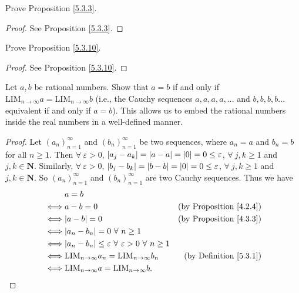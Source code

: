 \exercisesection

\begin{exercise}\label{ex 5.3.1}
    Prove Proposition \ref{5.3.3}.
\end{exercise}

\begin{proof}
    See Proposition \ref{5.3.3}.
\end{proof}

\begin{exercise}\label{ex 5.3.2}
    Prove Proposition \ref{5.3.10}.
\end{exercise}

\begin{proof}
    See Proposition \ref{5.3.10}.
\end{proof}

\begin{exercise}\label{ex 5.3.3}
    Let \(a, b\) be rational numbers.
    Show that \(a = b\) if and only if \(\text{LIM}_{n \to \infty} a = \text{LIM}_{n \to \infty} b\) (i.e., the Cauchy sequences \(a, a, a, a, \dots\) and \(b, b, b, b \dots\) equivalent if and only if \(a = b\)).
    This allows us to embed the rational numbers inside the real numbers in a well-defined manner.
\end{exercise}

\begin{proof}
    Let \((a_n)_{n = 1}^{\infty}\) and \((b_n)_{n = 1}^{\infty}\) be two sequences, where \(a_n = a\) and \(b_n = b\) for all \(n \geq 1\).
    Then \(\forall\ \varepsilon > 0\), \(\abs*{a_j - a_k} = \abs*{a - a} = \abs*{0} = 0 \leq \varepsilon\), \(\forall\ j, k \geq 1\) and \(j, k \in \mathbf{N}\).
    Similarly, \(\forall\ \varepsilon > 0\), \(\abs*{b_j - b_k} = \abs*{b - b} = \abs*{0} = 0 \leq \varepsilon\), \(\forall\ j, k \geq 1\) and \(j, k \in \mathbf{N}\).
    So \((a_n)_{n = 1}^{\infty}\) and \((b_n)_{n = 1}^{\infty}\) are two Cauchy sequences.
    Thus we have
    \begin{align*}
             & a = b                                                                                                                  \\
        \iff & a - b = 0                                                                        & \text{(by Proposition \ref{4.2.4})} \\
        \iff & \abs*{a - b} = 0                                                                 & \text{(by Proposition \ref{4.3.3})} \\
        \iff & \abs*{a_n - b_n} = 0 \ \forall\ n \geq 1                                                                               \\
        \iff & \abs*{a_n - b_n} \leq \varepsilon \ \forall\ \varepsilon > 0 \ \forall\ n \geq 1                                       \\
        \iff & \text{LIM}_{n \to \infty} a_n = \text{LIM}_{n \to \infty} b_n                    & \text{(by Definition \ref{5.3.1})}  \\
        \iff & \text{LIM}_{n \to \infty} a = \text{LIM}_{n \to \infty} b.
    \end{align*}
\end{proof}

